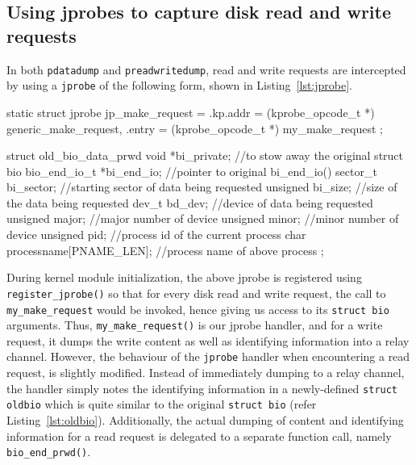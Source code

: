 \subsection{Using jprobes to capture disk read and write requests}
In both \texttt{pdatadump} and \texttt{preadwritedump}, read and write
requests are intercepted by using a \texttt{jprobe} of the following form,
shown in Listing~\ref{lst:jprobe}.
\begin{snippet}
static struct jprobe jp_make_request = {
    .kp.addr = (kprobe_opcode_t *) generic_make_request,
    .entry = (kprobe_opcode_t *) my_make_request
};  
\end{snippet}


\begin{snippet}
struct old_bio_data_prwd {
  void          *bi_private;    //to stow away the original struct bio
  bio_end_io_t  *bi_end_io;	    //pointer to original bi_end_io()
  sector_t      bi_sector;	    //starting sector of data being requested
  unsigned      bi_size;        //size of the data being requested
  dev_t         bd_dev;		    //device of data being requested
  unsigned      major;		    //major number of device
  unsigned      minor;		    //minor number of device
  unsigned      pid;   		    //process id of the current process
  char          processname[PNAME_LEN];	//process name of above process
};
\end{snippet}

During kernel module initialization, the above jprobe is registered
using \texttt{register\_jprobe()} so that for every disk read and write
request, the call to \texttt{my\_make\_request} would be invoked, hence
giving us access to its \texttt{struct bio} arguments.
Thus, \texttt{my\_make\_request()} is our jprobe handler, and for a write
request, it dumps the
write content as well as identifying information into a relay channel.
However, the behaviour of the \texttt{jprobe} handler when encountering
a read request, is slightly modified. Instead of immediately dumping
to a relay channel, the handler simply notes the identifying information
in a newly-defined \texttt{struct oldbio} which is quite similar to
the original \texttt{struct bio} (refer Listing~\ref{lst:oldbio}). 
Additionally, the actual dumping of
content and identifying information for a read request is delegated 
to a separate function call, namely \texttt{bio\_end\_prwd()}. 

